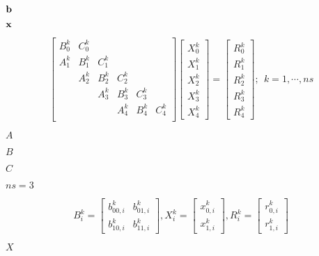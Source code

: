 \documentclass{article}
\begin{document}
${\bf b}$
\pagebreak

${\bf x}$
\pagebreak

\begin{equation} \left[\begin{array}{ccccc} B_0^k & C_0^k & & & \\ A_1^k & B_1^k & C_1^k & & \\ & A_2^k & B_2^k & C_2^k & & \\ & & A_3^k & B_3^k & C_3^k & \\ & & & A_4^k & B_4^k & C_4^k \\ \end{array}\right] \left[\begin{array}{c} X_0^k \\ X_1^k \\ X_2^k \\ X_3^k \\ X_4^k \end{array}\right] = \left[\begin{array}{c} R_0^k \\ R_1^k \\ R_2^k \\ R_3^k \\ R_4^k \end{array}\right]; \ \ k= 1,\cdots,ns \end{equation}
\pagebreak

$A$
\pagebreak

$B$
\pagebreak

$C$
\pagebreak

$ ns = 3$
\pagebreak

\begin{equation} B_i^k = \left[\begin{array}{cc} b_{00,i}^k & b_{01,i}^k \\ b_{10,i}^k & b_{11,i}^k \end{array}\right], X_i^k = \left[\begin{array}{c} x_{0,i}^k \\ x_{1,i}^k \end{array} \right], R_i^k = \left[\begin{array}{c} r_{0,i}^k \\ r_{1,i}^k \end{array} \right] \end{equation}
\pagebreak

$X$
\pagebreak
\end{document}
